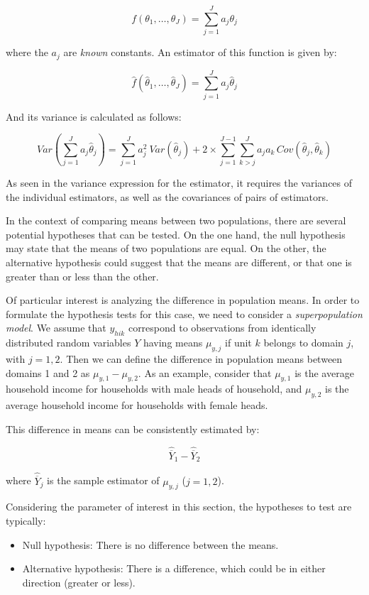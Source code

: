 \documentclass[
  12pt,
]{book}
\providecommand{\tightlist}{%
  \setlength{\itemsep}{0pt}\setlength{\parskip}{0pt}}
\begin{document}
\[
f \left( \theta_{1}, \ldots,\theta_{J}\right) = \sum_{j=1}^{J}a_{j}\theta_{j}
\]

where the \(a_{j}\) are \emph{known} constants. An estimator of this function is given by:

\[
\widehat{f} \left( \widehat{\theta}_{1}, \ldots, \widehat{\theta}_{J} \right) = \sum_{j=1}^{J} a_{j} \widehat{\theta}_{j}
\]

And its variance is calculated as follows:

\[
Var \left( \sum_{j=1}^{J} a_{j} \widehat{\theta}_{j} \right) = \sum_{j=1}^{J} a_{j}^{2} \ Var\left( \widehat{\theta}_{j} \right) + 2 \times \sum_{j=1}^{J-1} \sum_{k>j}^{J} a_{j} a_{k} \, Cov \left( \widehat{\theta}_{j} , \widehat{\theta}_{k} \right)
\]

As seen in the variance expression for the estimator, it requires the variances of the individual estimators, as well as the covariances of pairs of estimators.

In the context of comparing means between two populations, there are several potential hypotheses that can be tested. On the one hand, the null hypothesis may state that the means of two populations are equal. On the other, the alternative hypothesis could suggest that the means are different, or that one is greater than or less than the other.

Of particular interest is analyzing the difference in population means. In order to formulate the hypothesis tests for this case, we need to consider a \emph{superpopulation model}. We assume that \(y_{hik}\) correspond to observations from identically distributed random variables \(Y\) having means \(\mu_{y,j}\) if unit \(k\) belongs to domain \(j\), with \(j = 1, 2\). Then we can define the difference in population means between domains 1 and 2 as \(\mu_{y,1} - \mu_{y,2}\). As an example, consider that \(\mu_{y,1}\) is the average household income for households with male heads of household, and \(\mu_{y,2}\) is the average household income for households with female heads.

This difference in means can be consistently estimated by:

\[
\widehat{\overline{Y}}_{1} - \widehat{\overline{Y}}_{2}
\]

where \(\widehat{\overline{Y}}_{j}\) is the sample estimator of \(\mu_{y,j}\) (\(j = 1, 2\)).

Considering the parameter of interest in this section, the hypotheses to test are typically:

\begin{itemize}
\tightlist
\item
  Null hypothesis: There is no difference between the means.
\item
  Alternative hypothesis: There is a difference, which could be in either direction (greater or less).
\end{itemize}
\end{document}
